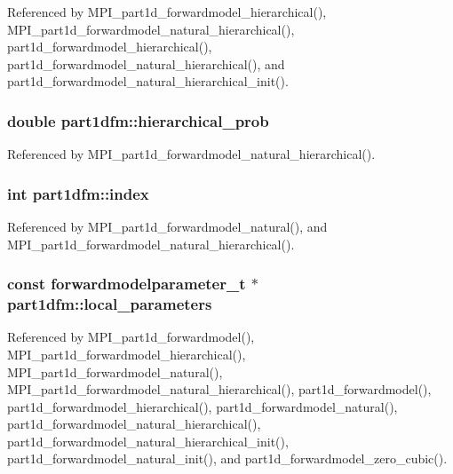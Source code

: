 Referenced by M\+P\+I\+\_\+part1d\+\_\+forwardmodel\+\_\+hierarchical(), M\+P\+I\+\_\+part1d\+\_\+forwardmodel\+\_\+natural\+\_\+hierarchical(), part1d\+\_\+forwardmodel\+\_\+hierarchical(), part1d\+\_\+forwardmodel\+\_\+natural\+\_\+hierarchical(), and part1d\+\_\+forwardmodel\+\_\+natural\+\_\+hierarchical\+\_\+init().

\subsubsection[{\texorpdfstring{hierarchical\+\_\+prob}{hierarchical_prob}}]{\setlength{\rightskip}{0pt plus 5cm}double part1dfm\+::hierarchical\+\_\+prob}\hypertarget{structpart1dfm_a8b03bc8981487f375fa3e9e287e7e820}{}\label{structpart1dfm_a8b03bc8981487f375fa3e9e287e7e820}


Referenced by M\+P\+I\+\_\+part1d\+\_\+forwardmodel\+\_\+natural\+\_\+hierarchical().

\subsubsection[{\texorpdfstring{index}{index}}]{\setlength{\rightskip}{0pt plus 5cm}int part1dfm\+::index}\hypertarget{structpart1dfm_aa05cf42805bbef44affc42a6904c92d3}{}\label{structpart1dfm_aa05cf42805bbef44affc42a6904c92d3}


Referenced by M\+P\+I\+\_\+part1d\+\_\+forwardmodel\+\_\+natural(), and M\+P\+I\+\_\+part1d\+\_\+forwardmodel\+\_\+natural\+\_\+hierarchical().

\subsubsection[{\texorpdfstring{local\+\_\+parameters}{local_parameters}}]{\setlength{\rightskip}{0pt plus 5cm}const {\bf forwardmodelparameter\+\_\+t} $\ast$ part1dfm\+::local\+\_\+parameters}\hypertarget{structpart1dfm_af12252cf6083f8193d4559e5c52dff94}{}\label{structpart1dfm_af12252cf6083f8193d4559e5c52dff94}


Referenced by M\+P\+I\+\_\+part1d\+\_\+forwardmodel(), M\+P\+I\+\_\+part1d\+\_\+forwardmodel\+\_\+hierarchical(), M\+P\+I\+\_\+part1d\+\_\+forwardmodel\+\_\+natural(), M\+P\+I\+\_\+part1d\+\_\+forwardmodel\+\_\+natural\+\_\+hierarchical(), part1d\+\_\+forwardmodel(), part1d\+\_\+forwardmodel\+\_\+hierarchical(), part1d\+\_\+forwardmodel\+\_\+natural(), part1d\+\_\+forwardmodel\+\_\+natural\+\_\+hierarchical(), part1d\+\_\+forwardmodel\+\_\+natural\+\_\+hierarchical\+\_\+init(), part1d\+\_\+forwardmodel\+\_\+natural\+\_\+init(), and part1d\+\_\+forwardmodel\+\_\+zero\+\_\+cubic().

